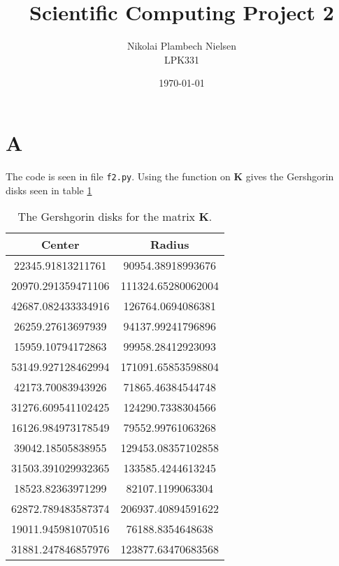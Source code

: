 \documentclass[a4paper,10pt]{article}
\title{Scientific Computing Project 2}
\author{Nikolai Plambech Nielsen\\LPK331}
\date{\today}
\begin{document}
	\maketitle
	\section*{A}
	The code is seen in file \texttt{f2.py}. Using the function on $ \textbf{K} $ gives the Gershgorin disks seen in table \ref{tab:disks}
	\begin{table}[H]
		\centering
		\begin{tabular}{c|c}
			Center & Radius \\
			\hline
			22345.91813211761 & 90954.38918993676 \\
			20970.291359471106 & 111324.65280062004\\
			42687.082433334916 & 126764.0694086381\\
			26259.27613697939 & 94137.99241796896\\
			15959.10794172863 & 99958.28412923093\\
			53149.927128462994 & 171091.65853598804\\
			42173.70083943926 & 71865.46384544748\\
			31276.609541102425 & 124290.7338304566\\
			16126.984973178549 & 79552.99761063268\\
			39042.18505838955 & 129453.08357102858\\
			31503.391029932365 & 133585.4244613245\\
			18523.82363971299 & 82107.1199063304\\
			62872.789483587374 & 206937.40894591622\\
			19011.945981070516 & 76188.8354648638\\
			31881.247846857976 & 123877.63470683568
		\end{tabular}
	\caption{The Gershgorin disks for the matrix $ \textbf{K} $.}
	\label{tab:disks}
	\end{table}
	
\end{document}
